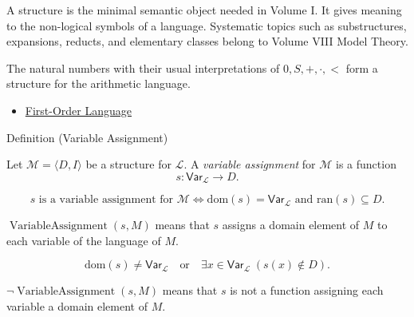 \begin{remark*}[Interpretation]
A structure is the minimal semantic object needed in Volume I. It gives
meaning to the non-logical symbols of a language. Systematic topics such as
substructures, expansions, reducts, and elementary classes belong to Volume
VIII Model Theory.
\end{remark*}

\begin{remark*}[Examples]
The natural numbers with their usual interpretations of \(0,S,+,\cdot,<\)
form a structure for the arithmetic language.
\end{remark*}

\begin{dependencies}
\begin{itemize}
  \item \hyperref[def:fo-language]{First-Order Language}
\end{itemize}
\end{dependencies}

\begin{definitionbox}{Definition (Variable Assignment)}
\begin{definition}
\label{def:var-assign}
Let \(\mathcal M=\langle D,I\rangle\) be a structure for \(\mathcal L\).
A \emph{variable assignment} for \(\mathcal M\) is a function
\[
s:\mathsf{Var}_{\mathcal L}\to D.
\]
\end{definition}
\end{definitionbox}

\begin{remark*}
\[
s \text{ is a variable assignment for } \mathcal M
\Longleftrightarrow
\mathrm{dom}(s)=\mathsf{Var}_{\mathcal L}
\text{ and }
\mathrm{ran}(s)\subseteq D.
\]
\end{remark*}

\begin{remark*}
\(\operatorname{VariableAssignment}(s,M)\) means that \(s\) assigns a domain
element of \(M\) to each variable of the language of \(M\).
\end{remark*}

\begin{remark*}
\[
\mathrm{dom}(s)\neq\mathsf{Var}_{\mathcal L}
\quad\text{or}\quad
\exists x\in\mathsf{Var}_{\mathcal L}\;(s(x)\notin D).
\]
\end{remark*}

\begin{remark*}
\(\neg\operatorname{VariableAssignment}(s,M)\) means that \(s\) is not a
function assigning each variable a domain element of \(M\).
\end{remark*}

